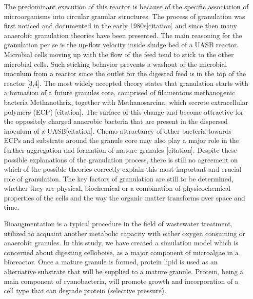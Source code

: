 The predominant execution of this reactor is because of the specific association of microorganisms into circular granular structures. The process of granulation was first noticed and documented in the early 1980s[citation] and since then many anaerobic granulation theories have been presented. The main reasoning for the granulation per se is the up-flow velocity inside sludge bed of a UASB reactor. Microbial cells moving up with the flow of the feed tend to stick to the other microbial cells. Such sticking behavior prevents a washout of the microbial inoculum from a reactor since the outlet for the digested feed is in the top of the reactor [3,4]. The most widely accepted theory states that granulation starts with a formation of a future granules core, comprised of filamentous methanogenic bacteria Methanothrix, together with Methanosarcina, which secrete extracellular polymers (ECP) [citation]. The surface of this change and become attractive for the oppositely charged anaerobic bacteria that are present in the dispersed inoculum of a UASB[citation]. Chemo-attractancy of other bacteria towards ECPs and substrate around the granule core may also play a major role in the further aggregation and formation of mature granules [citation]. Despite these possible explanations of the granulation process, there is still no agreement on which of the possible theories correctly explain this most important and crucial role of granulation. The key factors of granulation are still to be determined, whether they are physical, biochemical or a combination of physicochemical properties of the cells and the way the organic matter transforms over space and time.

Bioaugmentation is a typical procedure in the field of wastewater treatment, utilized to acquaint another metabolic capacity with either oxygen consuming or anaerobic granules. In this study, we have created a simulation model which is concerned about digesting celloboise, as a major component of microalgae in a bioreactor. Once a mature granule is formed, protein lipid is used as an alternative substrate that will be supplied to a mature granule. Protein, being a main component of cyanobacteria, will promote growth and incorporation of a cell type that can degrade protein (selective pressure). 

